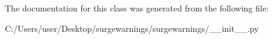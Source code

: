 The documentation for this class was generated from the following file\+:\begin{DoxyCompactItemize}
\item 
C\+:/\+Users/user/\+Desktop/surgewarnings/surgewarnings/\+\_\+\+\_\+init\+\_\+\+\_\+.\+py\end{DoxyCompactItemize}
